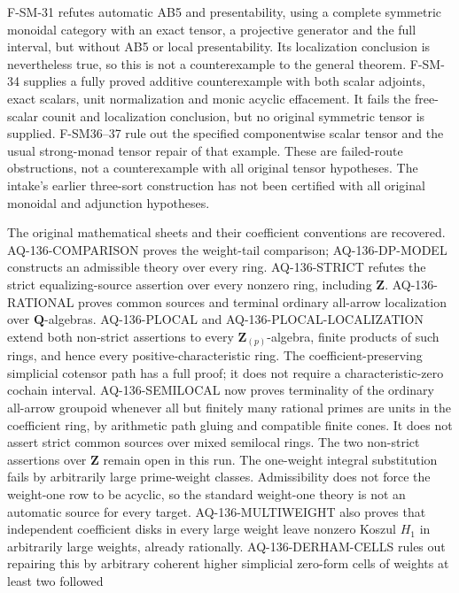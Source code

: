 \begin{description}[style=nextline,leftmargin=0pt]
F-SM-31 refutes automatic AB5 and presentability,
using a complete symmetric monoidal category with an exact tensor,
a projective generator and the full interval, but without AB5 or
local presentability. Its localization conclusion is nevertheless
true, so this is not a counterexample to the general theorem.
F-SM-34 supplies a fully proved additive counterexample with both
scalar adjoints, exact scalars, unit normalization and monic acyclic
effacement. It fails the free-scalar counit and localization conclusion,
but no original symmetric tensor is supplied.
F-SM36--37 rule out the specified componentwise scalar tensor and
the usual strong-monad tensor repair of that example. These are
failed-route obstructions, not a counterexample with all original
tensor hypotheses.
The intake's earlier
three-sort construction has not been certified with all original
monoidal and adjunction hypotheses.
\item[Cote 136, physical 111--121: the integral non-strict questions.]
The original mathematical sheets and their coefficient conventions
are recovered. AQ-136-COMPARISON proves the weight-tail comparison;
AQ-136-DP-MODEL constructs an admissible theory over every ring.
AQ-136-STRICT refutes the strict equalizing-source assertion over
every nonzero ring, including $\mathbf Z$.
AQ-136-RATIONAL proves common sources and terminal ordinary
all-arrow localization over $\mathbf Q$-algebras.
AQ-136-PLOCAL and AQ-136-PLOCAL-LOCALIZATION extend both non-strict
assertions to every $\mathbf Z_{(p)}$-algebra, finite products of such
rings, and hence every positive-characteristic ring.
The coefficient-preserving simplicial cotensor path has a full proof;
it does not require a characteristic-zero cochain interval.
AQ-136-SEMILOCAL now proves terminality of the ordinary all-arrow
groupoid whenever all but finitely many rational primes are units in
the coefficient ring, by arithmetic path gluing and compatible finite
cones. It does not assert strict common sources over mixed semilocal
rings. The two non-strict assertions over $\mathbf Z$ remain open in this
run. The one-weight integral substitution fails by arbitrarily large
prime-weight classes. Admissibility does not force the weight-one
row to be acyclic, so the standard weight-one theory is not an
automatic source for every target. AQ-136-MULTIWEIGHT also proves
that independent coefficient disks in every large weight leave nonzero
Koszul $H_1$ in arbitrarily large weights, already rationally.
AQ-136-DERHAM-CELLS rules out repairing this by arbitrary coherent
higher simplicial zero-form cells of weights at least two followed

\end{description}
